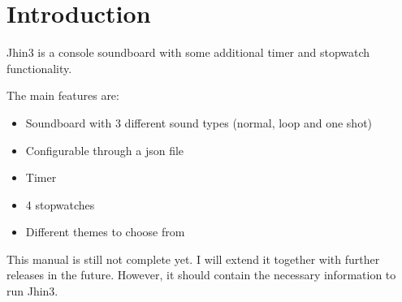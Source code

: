 \section{Introduction}

Jhin3 is a console soundboard with some additional timer and stopwatch functionality.

The main features are:
\begin{itemize}
\item Soundboard with 3 different sound types (normal, loop and one shot)
\item Configurable through a json file
\item Timer
\item 4 stopwatches
\item Different themes to choose from
\end{itemize}

This manual is still not complete yet. I will extend it together with further releases in the future. However, it should contain the necessary information to run Jhin3.

\newpage
